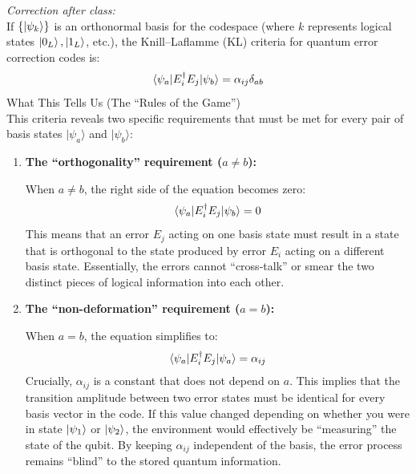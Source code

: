 \textit{Correction after class:} \\ 
If $\{\ket{\psi_k}\}$ is an orthonormal basis for the codespace (where $k$ represents logical states $\ket{0_L}, \ket{1_L}$, etc.), the Knill--Laflamme (KL) criteria for quantum error
correction codes is:
\begin{equation}
\braket{\psi_a | E_i^\dagger E_j | \psi_b} = \alpha_{ij}\delta_{ab}
\end{equation}
What This Tells Us (The ``Rules of the Game'') \\
This criteria reveals two specific requirements that must be met for every pair of basis states
$|\psi_a\rangle$ and $|\psi_b\rangle$:
\begin{enumerate}
\item \textbf{The ``orthogonality'' requirement ($a\neq b$):}

When $a\neq b$, the right side of the equation becomes zero:
\begin{equation}
\braket{\psi_a | E_i^\dagger E_j | \psi_b} = 0
\end{equation}
This means that an error $E_j$ acting on one basis state must result in a state that is
orthogonal to the state produced by error $E_i$ acting on a different basis state.
Essentially, the errors cannot ``cross-talk'' or smear the two distinct pieces of logical
information into each other.

\item \textbf{The ``non-deformation'' requirement ($a=b$):}

When $a=b$, the equation simplifies to:
\begin{equation}
\braket{\psi_a | E_i^\dagger E_j | \psi_a} = \alpha_{ij}
\end{equation}
Crucially, $\alpha_{ij}$ is a constant that does not depend on $a$. This implies that the
transition amplitude between two error states must be identical for every basis vector in the
code. If this value changed depending on whether you were in state $\ket{\psi_1}$ or
$\ket{\psi_2}$, the environment would effectively be ``measuring'' the state of the qubit.
By keeping $\alpha_{ij}$ independent of the basis, the error process remains ``blind'' to the
stored quantum information.
\end{enumerate}


